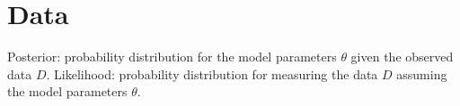 \chapter{Data}
Posterior: probability distribution for the model parameters $\theta$ given the observed data $D$.
Likelihood: probability distribution for measuring the data $D$ assuming the model parameters $\theta$. 